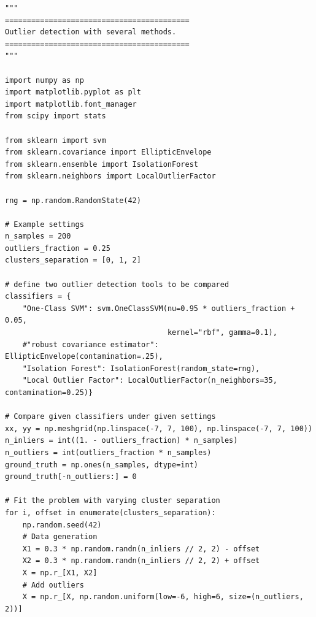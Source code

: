 \begin{mdframed}[hidealllines=true, backgroundcolor=lightgray] 
\begin{verbatim}
"""
==========================================
Outlier detection with several methods.
==========================================
"""

import numpy as np
import matplotlib.pyplot as plt
import matplotlib.font_manager
from scipy import stats

from sklearn import svm
from sklearn.covariance import EllipticEnvelope
from sklearn.ensemble import IsolationForest
from sklearn.neighbors import LocalOutlierFactor

rng = np.random.RandomState(42)

# Example settings
n_samples = 200
outliers_fraction = 0.25
clusters_separation = [0, 1, 2]

# define two outlier detection tools to be compared
classifiers = {
    "One-Class SVM": svm.OneClassSVM(nu=0.95 * outliers_fraction + 0.05,
                                     kernel="rbf", gamma=0.1),
    #"robust covariance estimator": EllipticEnvelope(contamination=.25),
    "Isolation Forest": IsolationForest(random_state=rng),
    "Local Outlier Factor": LocalOutlierFactor(n_neighbors=35, contamination=0.25)}

# Compare given classifiers under given settings
xx, yy = np.meshgrid(np.linspace(-7, 7, 100), np.linspace(-7, 7, 100))
n_inliers = int((1. - outliers_fraction) * n_samples)
n_outliers = int(outliers_fraction * n_samples)
ground_truth = np.ones(n_samples, dtype=int)
ground_truth[-n_outliers:] = 0

# Fit the problem with varying cluster separation
for i, offset in enumerate(clusters_separation):
    np.random.seed(42)
    # Data generation
    X1 = 0.3 * np.random.randn(n_inliers // 2, 2) - offset
    X2 = 0.3 * np.random.randn(n_inliers // 2, 2) + offset
    X = np.r_[X1, X2]
    # Add outliers
    X = np.r_[X, np.random.uniform(low=-6, high=6, size=(n_outliers, 2))]


\end{verbatim}
\end{mdframed}

